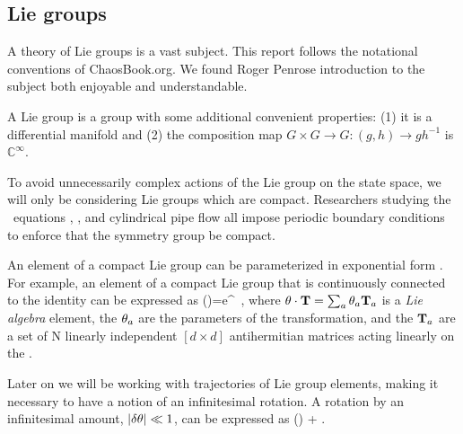 {\subsection{Lie groups}

A theory of Lie groups is a vast subject. This report follows the notational conventions of ChaosBook.org. We found Roger Penrose introduction to the subject both enjoyable and understandable.

A Lie group is a group with some additional convenient properties:
(1) it is a differential manifold
and (2) the composition map $G \times G \rightarrow G : (g,h)
\rightarrow g h^{-1}$ is $\mathbb{C}^\infty$.

To avoid unnecessarily complex actions of the Lie group on the state space, we will only be considering Lie groups which are compact. Researchers studying the \KS\ equations , {\pCf} , and cylindrical pipe flow  all impose periodic boundary conditions to enforce that the symmetry group be compact.

An element of a compact Lie group can be parameterized in exponential form .
For example,
an element of a compact Lie group that is continuously
connected to the identity can be expressed as
\beq
\LieEl(\gSpace)=e^{{\gSpace} \cdot \Lg }
\,,
where ${\bf \theta} \cdot \mathbf{T} = \sum_a {\bf \theta}_a \mathbf{T}_a$ is a \emph{Lie algebra} element, the ${\bf \theta}_a$ are the parameters of the transformation, and the $\mathbf{T}_a$ are a set of N linearly independent
$[d\times d]$ antihermitian matrices acting linearly on the
{\statesp}.
%

Later on we will be working with trajectories of Lie group elements, making it necessary to have a notion of an infinitesimal rotation. A rotation by an infinitesimal amount, $|\delta {\bf \theta}| \ll
1$, can be expressed as
\beq
\LieEl(\delta \gSpace)  + \delta \gSpace \cdot \Lg.

}
